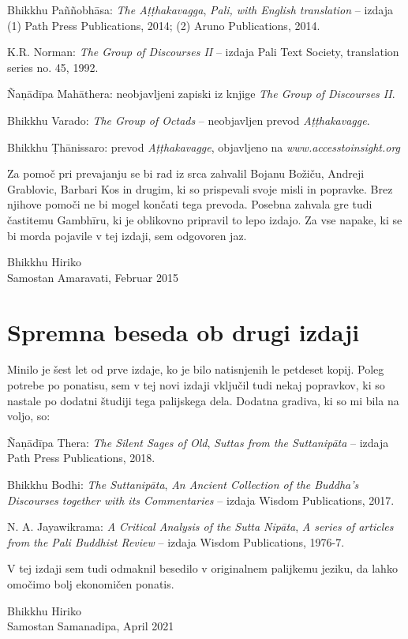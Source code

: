 \begin{packeditemize}
\item
  Bhikkhu Paññobhāsa: \emph{The Aṭṭhakavagga}, \emph{Pali, with English
  translation} -- izdaja (1) Path Press Publications, 2014; (2) Aruno
  Publications, 2014.
\item
  K.R. Norman: \emph{The Group of Discourses II} -- izdaja Pali Text
  Society, translation series no. 45, 1992.
\item
  Ñaṇādīpa Mahāthera: neobjavljeni zapiski iz knjige \emph{The Group of
  Discourses II}.
\item
  Bhikkhu Varado: \emph{The Group of Octads} -- neobjavljen prevod
  \emph{Aṭṭhakavagge}.
\item
  Bhikkhu Ṭhānissaro: prevod \emph{Aṭṭhakavagge}, objavljeno na \emph{www.accesstoinsight.org}
\end{packeditemize}

Za pomoč pri prevajanju se bi rad iz srca zahvalil Bojanu Božiču,
Andreji Grablovic, Barbari Kos in drugim, ki so prispevali svoje misli
in popravke. Brez njihove pomoči ne bi mogel končati tega prevoda.
Posebna zahvala gre tudi častitemu Gambhīru, ki je oblikovno pripravil
to lepo izdajo. Za vse napake, ki se bi morda pojavile v tej izdaji, sem
odgovoren jaz.

{\raggedleft
Bhikkhu Hiriko\\
Samostan Amaravati, Februar 2015
\par}

\clearpage

\section{Spremna beseda ob drugi izdaji}

Minilo je šest let od prve izdaje, ko je bilo natisnjenih le petdeset 
kopij. Poleg potrebe po ponatisu, sem v tej novi izdaji vključil tudi 
nekaj popravkov, ki so nastale po dodatni študiji tega palijskega dela.
Dodatna gradiva, ki so mi bila na voljo, so:

\begin{packeditemize}
\item
  Ñaṇādīpa Thera: \emph{The Silent Sages of Old}, \emph{Suttas from the Suttanipāta} -- izdaja Path Press Publications, 2018.
\item
  Bhikkhu Bodhi: \emph{The Suttanipāta}, \emph{An Ancient Collection of the Buddha's Discourses together with its Commentaries} -- izdaja Wisdom Publications, 2017.
\item
  N. A. Jayawikrama: \emph{A Critical Analysis of the Sutta Nipāta}, \emph{A series of articles from the Pali Buddhist Review} -- izdaja Wisdom Publications, 1976-7.
\end{packeditemize}

V tej izdaji sem tudi odmaknil besedilo v originalnem palijkemu jeziku,
da lahko omočimo bolj ekonomičen ponatis.

\bigskip

{\raggedleft
Bhikkhu Hiriko\\
Samostan Samanadipa, April 2021
\par}

